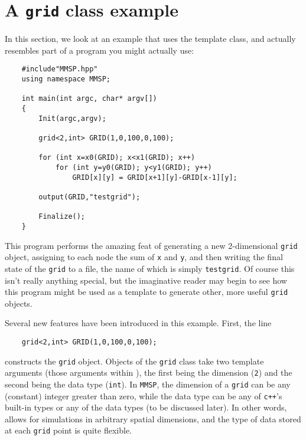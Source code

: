 \section{A {\tt grid} class example}
In this section, we look at an example that uses the  template class, and actually resembles part of a program you might actually use:
\begin{shadebox}
\begin{verbatim}
    #include"MMSP.hpp"
    using namespace MMSP;

    int main(int argc, char* argv[])
    {
        Init(argc,argv);

        grid<2,int> GRID(1,0,100,0,100);

        for (int x=x0(GRID); x<x1(GRID); x++)
            for (int y=y0(GRID); y<y1(GRID); y++)
                GRID[x][y] = GRID[x+1][y]-GRID[x-1][y];

        output(GRID,"testgrid");

        Finalize();
    }
\end{verbatim}
\end{shadebox}
This program performs the amazing feat of generating a new 2-dimensional {\tt grid} object, assigning to each node the sum of {\tt x} and {\tt y}, and then writing the final state of the {\tt grid} to a file, the name of which is simply {\tt testgrid}.  Of course this isn't really anything special, but the imaginative reader may begin to see how this program might be used as a template to generate other, more useful {\tt grid} objects.

Several new features have been introduced in this example.  First, the line
\begin{shadebox}
\begin{verbatim}
    grid<2,int> GRID(1,0,100,0,100);
\end{verbatim}
\end{shadebox}
constructs the {\tt grid} object.  Objects of the {\tt grid} class take two template arguments (those arguments within {\tt < >}), the first being the dimension ({\tt 2}) and the second being the data type ({\tt int}).  In {\tt MMSP}, the dimension of a {\tt grid} can be any (constant) integer greater than zero, while the data type can be any of {\tt c++}'s built-in types or any of the \MMSP data types (to be discussed later).  In other words, \MMSP allows for simulations in arbitrary spatial dimensions, and the type of data stored at each {\tt grid} point is quite flexible.


